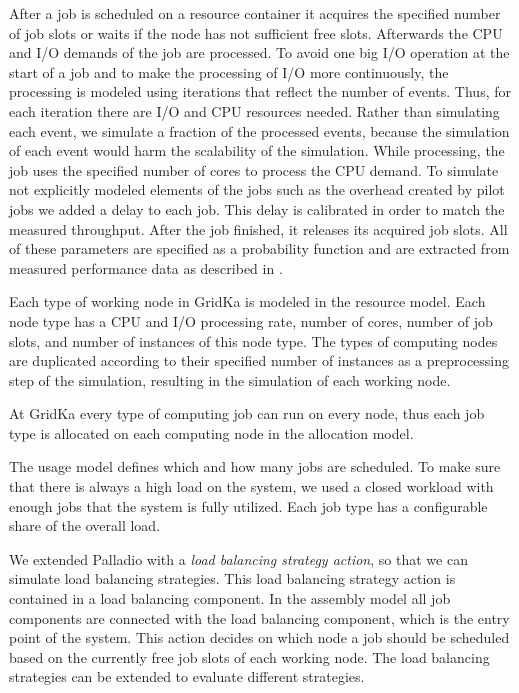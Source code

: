 \documentclass[a4paper]{jpconf}
\begin{document}
After a job is scheduled on a resource container it acquires the specified number of job slots or waits if the node has not sufficient free slots. Afterwards the CPU and I/O demands of the job are processed. To avoid one big I/O operation at the start of a job and to make the processing of I/O more continuously, the processing is modeled using iterations that reflect the number of events. Thus, for each iteration there are I/O and CPU resources needed. Rather than simulating each event, we simulate a fraction of the processed events, because the simulation of each event would harm the scalability of the simulation. 
While processing, the job uses the specified number of cores to process the CPU demand. To simulate not explicitly modeled elements of the jobs such as the overhead created by pilot jobs we added a delay to each job. This delay is calibrated in order to match the measured throughput. After the job finished, it releases its acquired job slots. All of these parameters are specified as a probability function and are extracted from measured performance data as described in .

Each type of working node in GridKa is modeled in the resource model. Each node type has a CPU and I/O processing rate, number of cores, number of job slots, and number of instances of this node type. The types of computing nodes are duplicated according to their specified number of instances as a preprocessing step of the simulation, resulting in the simulation of each working node.

At GridKa every type of computing job can run on every node, thus each job type is allocated on each computing node in the allocation model.

The usage model defines which and how many jobs are scheduled. To make sure that there is always a high load on the system, we used a closed workload with enough jobs that the system is fully utilized. Each job type has a configurable share of the overall load.

We extended Palladio with a \textit{load balancing strategy action}, so that we can simulate load balancing strategies.
This load balancing strategy action is contained in a load balancing component.
In the assembly model all job components are connected with the load balancing component, which is the entry point of the system.
This action decides on which node a job should be scheduled based on the currently free job slots of each working node. The load balancing strategies can be extended to evaluate different strategies.
\end{document}
